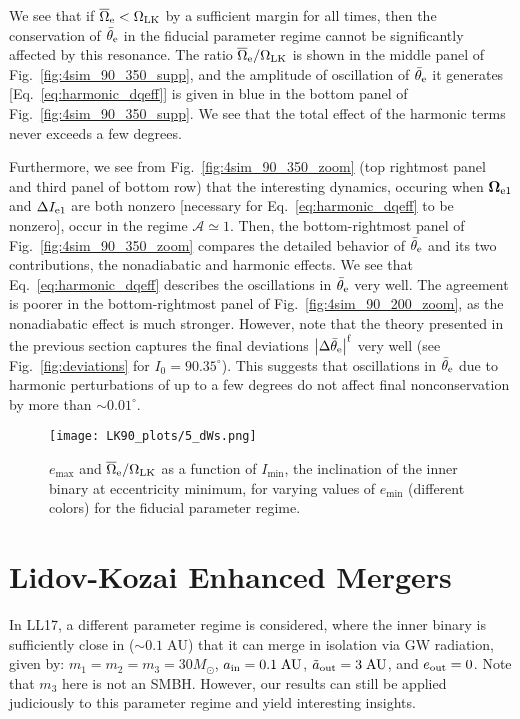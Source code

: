 \documentclass[
        twocolumn,
        twocolappendix
    ]{aastex63}
\newcommand*{\abs}[1]{\left|#1\right|}
\renewcommand*{\bm}[1]{\boldsymbol{\mathbf{#1}}}
\begin{document}
We see that if $\overline{\Omega}_{\rm e} < \Omega_{\rm LK}$ by a sufficient
margin for all times, then the conservation of $\bar{\theta}_{\rm e}$ in the
fiducial parameter regime cannot be significantly affected by this resonance.
The ratio $\overline{\Omega}_{\rm e} / \Omega_{\rm LK}$ is shown in the middle
panel of Fig.~\ref{fig:4sim_90_350_supp}, and the amplitude of oscillation of
$\bar{\theta}_{\rm e}$ it generates [Eq.~\eqref{eq:harmonic_dqeff}] is given in
blue in the bottom panel of Fig.~\ref{fig:4sim_90_350_supp}. We see that the
total effect of the harmonic terms never exceeds a few degrees.

Furthermore, we see from Fig.~\ref{fig:4sim_90_350_zoom} (top rightmost panel and
third panel of bottom row) that the interesting dynamics, occuring when
$\bm{\Omega}_{\rm e1}$ and $\Delta I_{\rm e1}$ are both nonzero [necessary for
Eq.~\eqref{eq:harmonic_dqeff} to be nonzero], occur in the regime $\mathcal{A}
\simeq 1$. Then, the bottom-rightmost panel of Fig.~\ref{fig:4sim_90_350_zoom}
compares the detailed behavior of $\bar{\theta}_{\rm e}$ and its two
contributions, the nonadiabatic and harmonic effects. We see that
Eq.~\eqref{eq:harmonic_dqeff} describes the oscillations in $\bar{\theta}_{\rm
e}$ very well. The agreement is poorer in the bottom-rightmost panel of
Fig.~\ref{fig:4sim_90_200_zoom}, as the nonadiabatic effect is much stronger.
However, note that the theory presented in the previous section captures the
final deviations $\abs{\Delta \bar{\theta}_{\rm e}}^{\rm f}$ very well (see
Fig.~\ref{fig:deviations} for $I_0 = 90.35^\circ$). This suggests that
oscillations in $\bar{\theta}_{\rm e}$ due to harmonic perturbations of up to a
few degrees do not affect final nonconservation by more than $\sim 0.01^\circ$.

\begin{figure}
    \centering
    \texttt{[image: LK90\_plots/5\_dWs.png]}
    \caption{$e_{\max}$ and $\overline{\Omega}_{\rm e} / \Omega_{\rm LK}$ as a
    function of $I_{\min}$, the inclination of the inner binary at eccentricity
    minimum, for varying values of $e_{\min}$ (different colors) for the
    fiducial parameter regime. }\label{fig:dWs}
\end{figure}

\section{Lidov-Kozai Enhanced Mergers}\label{s:lk_enhanced}

In LL17, a different parameter regime is considered,
where the inner binary is sufficiently close in ($\sim 0.1\;\mathrm{AU}$) that
it can merge in isolation via GW radiation, given by: $m_1 = m_2 = m_3 =
30M_{\odot}$, $a_{\rm in} = 0.1\;\mathrm{AU}$, $\tilde{a}_{\rm out} = 3\;\mathrm{AU}$,
and $e_{\rm out} = 0$. Note that $m_3$ here is not an SMBH\@. However, our results can
still be applied judiciously to this parameter regime and yield interesting
insights.
\end{document}

